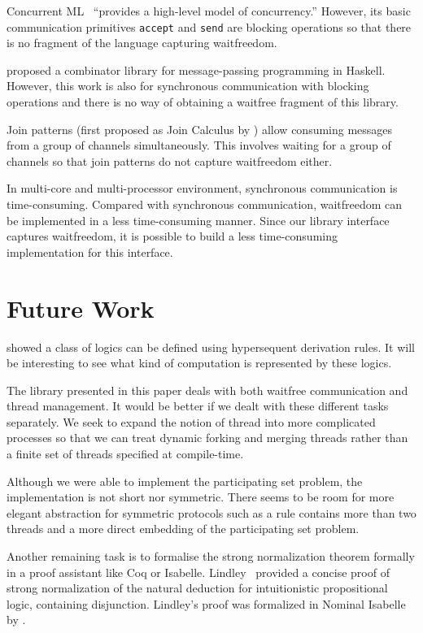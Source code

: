 Concurrent ML~\citep{concurrentML} ``provides a high-level model of
concurrency.''  However, its basic communication primitives
\texttt{accept} and \texttt{send} are blocking operations so that there
is no fragment of the language capturing waitfreedom.

\citet{Brown} proposed a combinator library for message-passing
programming in Haskell.  However, this work is also for synchronous
communication with blocking operations and there is no way of
obtaining a waitfree
fragment of this library.

Join patterns (first proposed as Join Calculus by \citet{join}) allow
consuming messages from a group of
channels simultaneously.  This involves waiting for a group of channels
so that join patterns do not capture waitfreedom either.

In multi-core and multi-processor environment, synchronous communication
is time-consuming.  Compared with
synchronous communication, waitfreedom can be implemented in a less
time-consuming manner.  Since our library
interface captures waitfreedom, it is possible to build a less
time-consuming implementation for this interface.

\section{Future Work}

\citet*{agt08} showed a class of logics can be defined using
hypersequent derivation rules.  It will be interesting to see what kind
of computation is represented by these logics.

The library presented in this paper deals with both waitfree
communication and thread management.  It would be better if we dealt with
these different tasks separately.
 We seek to expand the notion of thread into more complicated
 processes so that we can treat dynamic
 forking and merging threads rather
 than a finite set of threads specified at compile-time.

Although we were able to implement the participating set problem,
the implementation is not short nor symmetric.
There seems to be room for more elegant abstraction for symmetric
protocols such as
a rule contains more than two threads and a more direct embedding of the
participating set problem.

Another remaining task is to formalise the strong normalization theorem
formally in a proof assistant like Coq or Isabelle.
Lindley~ provided a concise proof of strong normalization of
the natural deduction for
intuitionistic propositional logic, containing disjunction.
Lindley's proof was formalized in Nominal Isabelle by .
